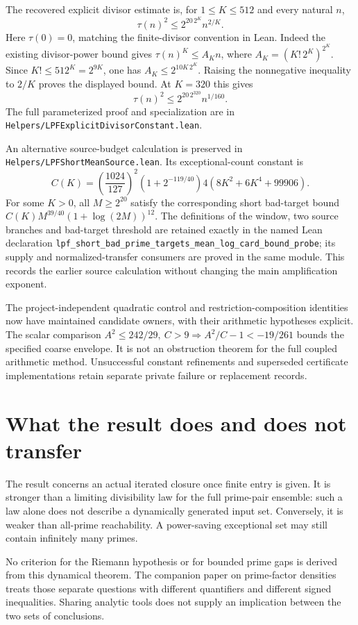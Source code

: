 \documentclass[11pt]{article}
\theoremstyle{definition}
\theoremstyle{remark}
\newcommand{\lean}[1]{\nolinkurl{#1}}
\begin{document}
The recovered explicit divisor estimate is, for \(1\le K\le512\)
and every natural \(n\),
\[
 \tau(n)^2\le
  2^{20\,2^K} n^{2/K}.
\]
Here \(\tau(0)=0\), matching the finite-divisor convention in Lean.
Indeed the existing divisor-power bound gives
\(\tau(n)^K\le A_Kn\), where
\(A_K=(K!\,2^K)^{2^K}\).
Since \(K!\le512^K=2^{9K}\), one has
\(A_K\le2^{10K\,2^K}\). Raising the nonnegative inequality to
\(2/K\) proves the displayed bound. At \(K=320\) this gives
\[
 \tau(n)^2\le2^{20\,2^{320}}n^{1/160}.
\]
The full parameterized proof and specialization are in
\lean{Helpers/LPFExplicitDivisorConstant.lean}.

An alternative source-budget calculation is preserved in
\lean{Helpers/LPFShortMeanSource.lean}. Its exceptional-count constant is
\[
 C(K)=\left(\frac{1024}{127}\right)^2
       \left(1+2^{-119/40}\right)
       4(8K^2+6K^4+99906).
\]
For some \(K>0\), all \(M\ge2^{20}\) satisfy the corresponding
short bad-target bound
\(C(K)M^{39/40}(1+\log(2M))^{12}\).
The definitions of the window, two source branches and bad-target
threshold are retained exactly in the named Lean declaration
{\small\lean{lpf_short_bad_prime_targets_mean_log_card_bound_probe}};
its supply and normalized-transfer consumers are proved in the same
module. This records the earlier source calculation without changing
the main amplification exponent.

The project-independent quadratic control and restriction-composition
identities now have maintained candidate owners, with their arithmetic
hypotheses explicit. The scalar comparison
\(A^2\le242/29,\ C>9\Rightarrow A^2/C-1<-19/261\)
bounds the specified coarse envelope. It is not an obstruction theorem
for the full coupled arithmetic method. Unsuccessful constant refinements
and superseded certificate implementations retain separate private
failure or replacement records.

\section{What the result does and does not transfer}

The result concerns an actual iterated closure once finite entry is
given. It is stronger than a limiting divisibility law for the full
prime-pair ensemble: such a law alone does not describe a dynamically
generated input set. Conversely, it is weaker than all-prime
reachability. A power-saving exceptional set may still contain infinitely
many primes.

No criterion for the Riemann hypothesis or for bounded prime gaps is
derived from this dynamical theorem. The companion paper on
prime-factor densities treats those separate questions with different
quantifiers and different signed inequalities. Sharing analytic tools
does not supply an implication between the two sets of conclusions.
\end{document}
